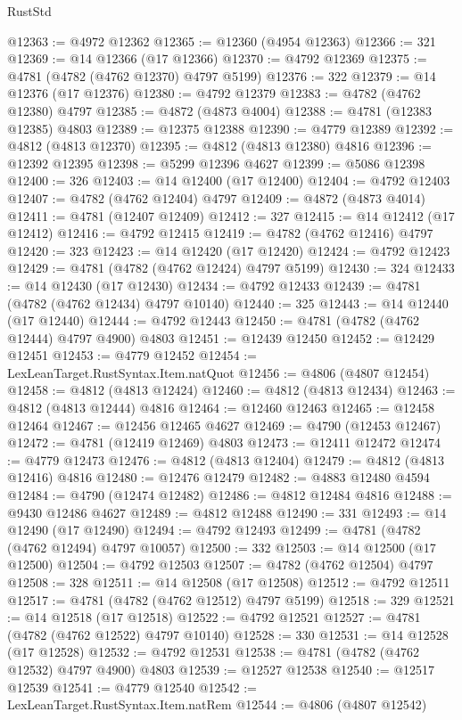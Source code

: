 \begin{lexlean}{RustStd}
\begin{coremodule}
@12363 := @4972 @12362
@12365 := @12360 (@4954 @12363)
@12366 := 321
@12369 := @14 @12366 (@17 @12366)
@12370 := @4792 @12369
@12375 := @4781 (@4782 (@4762 @12370) @4797 @5199)
@12376 := 322
@12379 := @14 @12376 (@17 @12376)
@12380 := @4792 @12379
@12383 := @4782 (@4762 @12380) @4797
@12385 := @4872 (@4873 @4004)
@12388 := @4781 (@12383 @12385) @4803
@12389 := @12375 @12388
@12390 := @4779 @12389
@12392 := @4812 (@4813 @12370)
@12395 := @4812 (@4813 @12380) @4816
@12396 := @12392 @12395
@12398 := @5299 @12396 @4627
@12399 := @5086 @12398
@12400 := 326
@12403 := @14 @12400 (@17 @12400)
@12404 := @4792 @12403
@12407 := @4782 (@4762 @12404) @4797
@12409 := @4872 (@4873 @4014)
@12411 := @4781 (@12407 @12409)
@12412 := 327
@12415 := @14 @12412 (@17 @12412)
@12416 := @4792 @12415
@12419 := @4782 (@4762 @12416) @4797
@12420 := 323
@12423 := @14 @12420 (@17 @12420)
@12424 := @4792 @12423
@12429 := @4781 (@4782 (@4762 @12424) @4797 @5199)
@12430 := 324
@12433 := @14 @12430 (@17 @12430)
@12434 := @4792 @12433
@12439 := @4781 (@4782 (@4762 @12434) @4797 @10140)
@12440 := 325
@12443 := @14 @12440 (@17 @12440)
@12444 := @4792 @12443
@12450 := @4781 (@4782 (@4762 @12444) @4797 @4900) @4803
@12451 := @12439 @12450
@12452 := @12429 @12451
@12453 := @4779 @12452
@12454 := LexLeanTarget.RustSyntax.Item.natQuot
@12456 := @4806 (@4807 @12454)
@12458 := @4812 (@4813 @12424)
@12460 := @4812 (@4813 @12434)
@12463 := @4812 (@4813 @12444) @4816
@12464 := @12460 @12463
@12465 := @12458 @12464
@12467 := @12456 @12465 @4627
@12469 := @4790 (@12453 @12467)
@12472 := @4781 (@12419 @12469) @4803
@12473 := @12411 @12472
@12474 := @4779 @12473
@12476 := @4812 (@4813 @12404)
@12479 := @4812 (@4813 @12416) @4816
@12480 := @12476 @12479
@12482 := @4883 @12480 @4594
@12484 := @4790 (@12474 @12482)
@12486 := @4812 @12484 @4816
@12488 := @9430 @12486 @4627
@12489 := @4812 @12488
@12490 := 331
@12493 := @14 @12490 (@17 @12490)
@12494 := @4792 @12493
@12499 := @4781 (@4782 (@4762 @12494) @4797 @10057)
@12500 := 332
@12503 := @14 @12500 (@17 @12500)
@12504 := @4792 @12503
@12507 := @4782 (@4762 @12504) @4797
@12508 := 328
@12511 := @14 @12508 (@17 @12508)
@12512 := @4792 @12511
@12517 := @4781 (@4782 (@4762 @12512) @4797 @5199)
@12518 := 329
@12521 := @14 @12518 (@17 @12518)
@12522 := @4792 @12521
@12527 := @4781 (@4782 (@4762 @12522) @4797 @10140)
@12528 := 330
@12531 := @14 @12528 (@17 @12528)
@12532 := @4792 @12531
@12538 := @4781 (@4782 (@4762 @12532) @4797 @4900) @4803
@12539 := @12527 @12538
@12540 := @12517 @12539
@12541 := @4779 @12540
@12542 := LexLeanTarget.RustSyntax.Item.natRem
@12544 := @4806 (@4807 @12542)

\end{coremodule}
\end{lexlean}
